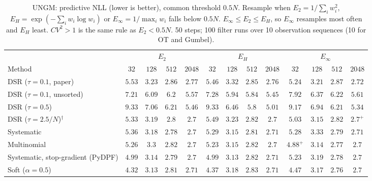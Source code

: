 \begin{table}[ht]
\centering
\small
\caption{UNGM: predictive NLL (lower is better), common threshold $0.5N$. Resample when $E_2=1/\sum_iw_i^2$, $E_H=\exp(-\sum_iw_i\log w_i)$ or $E_\infty=1/\max_iw_i$ falls below $0.5N$. $E_\infty\le E_2\le E_H$, so $E_\infty$ resamples most often and $E_H$ least. $CV^2>1$ is the same rule as $E_2<0.5N$. 50 steps; 100 filter runs over 10 observation sequences (10 for OT and Gumbel).}
\label{tab:trigger-fixed-ungm-predictive_nll}
\begin{adjustbox}{max width=\linewidth}
\begin{tabular}{lcccc|cccc|cccc}
\toprule
 & \multicolumn{4}{c}{$E_2$} & \multicolumn{4}{c}{$E_H$} & \multicolumn{4}{c}{$E_\infty$} \\
\cmidrule(lr){2-5} \cmidrule(lr){6-9} \cmidrule(lr){10-13}
Method & $32$ & $128$ & $512$ & $2048$ & $32$ & $128$ & $512$ & $2048$ & $32$ & $128$ & $512$ & $2048$ \\
\midrule
DSR ($\tau{=}0.1$, paper) & $5.53$ & $3.23$ & $2.86$ & $2.77$ & $5.46$ & $3.32$ & $\mathbf{2.85}$ & $2.76$ & $\mathbf{5.24}$ & $\mathbf{3.21}$ & $2.87$ & $\mathbf{2.72}$ \\
DSR ($\tau{=}0.1$, unsorted) & $\mathbf{7.21}$ & $6.09$ & $6.2$ & $5.57$ & $7.28$ & $\mathbf{5.94}$ & $\mathbf{5.84}$ & $\mathbf{5.45}$ & $7.92$ & $6.37$ & $6.22$ & $5.61$ \\
DSR ($\tau{=}0.5$) & $9.33$ & $7.06$ & $6.21$ & $5.46$ & $9.33$ & $\mathbf{6.46}$ & $\mathbf{5.8}$ & $\mathbf{5.01}$ & $\mathbf{9.17}$ & $6.94$ & $6.21$ & $5.34$ \\
DSR ($\tau{=}2.5/N$)$^\dagger$ & $5.33$ & $3.19$ & $\mathbf{2.8}$ & $2.7$ & $5.49$ & $3.23$ & $2.82$ & $2.7$ & $\mathbf{5.03}$ & $\mathbf{3.15}$ & $2.82$ & $\mathbf{2.7}^{+}$ \\
\midrule
Systematic & $5.36$ & $3.18$ & $\mathbf{2.78}$ & $\mathbf{2.7}$ & $5.29$ & $\mathbf{3.15}$ & $2.81$ & $2.71$ & $\mathbf{5.28}$ & $3.33$ & $2.79$ & $2.71$ \\
Multinomial & $5.26$ & $3.3$ & $2.82$ & $2.7$ & $5.23$ & $3.15$ & $2.82$ & $\mathbf{2.7}$ & $\mathbf{4.88}^{+}$ & $\mathbf{3.14}$ & $\mathbf{2.77}$ & $2.7$ \\
Systematic, stop-gradient (PyDPF) & $\mathbf{4.99}$ & $3.14$ & $2.79$ & $\mathbf{2.7}$ & $4.99$ & $\mathbf{3.13}$ & $2.82$ & $2.71$ & $5.23$ & $3.19$ & $\mathbf{2.78}$ & $2.7$ \\
Soft ($\alpha{=}0.5$) & $\mathbf{4.32}$ & $\mathbf{3.13}$ & $2.81$ & $2.71$ & $4.37$ & $3.18$ & $2.83$ & $2.71$ & $4.47$ & $3.17$ & $\mathbf{2.76}$ & $\mathbf{2.7}$ \\

\end{tabular}
\end{adjustbox}
\end{table}
